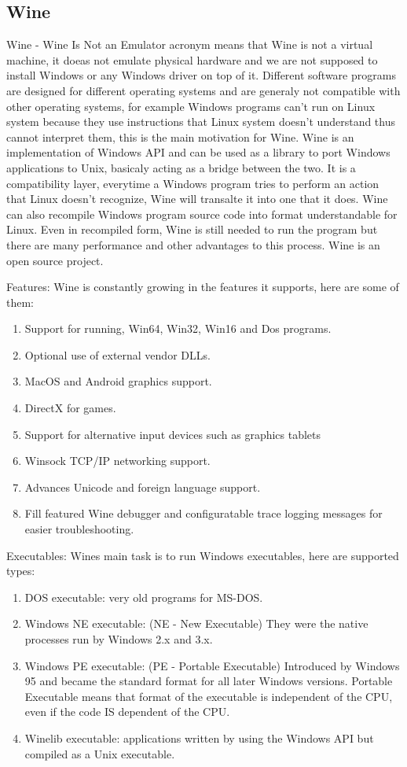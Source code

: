 \begin{enumerate}
\section{Wine}
Wine - Wine Is Not an Emulator acronym means that Wine is not a virtual machine, it doeas not emulate physical hardware and we are not supposed to install Windows or any Windows driver on top of it. Different software programs are designed for different operating systems and are generaly not compatible with other operating systems, for example Windows programs can't run on Linux system because they use instructions that Linux system doesn't understand thus cannot interpret them, this is the main motivation for Wine. Wine is an implementation of Windows API and can be used as a library to port Windows applications to Unix, basicaly acting as a bridge between the two. It is a compatibility layer, everytime a Windows program tries to perform an action that Linux doesn't recognize, Wine will transalte it into one that it does. Wine can also recompile Windows program source code into format understandable for Linux. Even in recompiled form, Wine is still needed to run the program but there are many performance and other advantages to this process. Wine is an open source project.

Features:
Wine is constantly growing in the features it supports, here are some of them:
\begin{enumerate}
\item Support for running, Win64, Win32, Win16 and Dos programs.
\item Optional use of external vendor DLLs.
\item MacOS and Android graphics support.
\item DirectX for games.
\item Support for alternative input devices such as graphics tablets
\item Winsock TCP/IP networking support.
\item Advances Unicode and foreign language support.
\item Fill featured Wine debugger and configuratable trace logging messages for easier troubleshooting.
\end{enumerate}

Executables:
Wines main task is to run Windows executables, here are supported types:
\begin{enumerate}
\item DOS executable: very old programs for MS-DOS.
\item Windows NE executable: (NE - New Executable) They were the native processes run by Windows 2.x and 3.x.
\item Windows PE executable: (PE - Portable Executable) Introduced by Windows 95 and became the standard format for all later Windows versions. Portable Executable means that format of the executable is independent of the CPU, even if the code IS dependent of the CPU.
\item Winelib executable: applications written by using the Windows API but compiled as a Unix executable.
\end{enumerate}


\end{enumerate}

